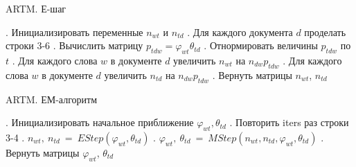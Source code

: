 \documentclass[12pt]{article}
\newenvironment{rusalgorithm}[1][htb]
  {\renewcommand{\algorithmcfname}{Алгоритм}
   \begin{algorithm}[#1]
  }{\end{algorithm}}
\renewcommand{\phi}{\varphi}
\begin{document}
\begin{rusalgorithm}[H]
\caption{ARTM. Е-шаг}\label{malgo4}
\begin{algorithmic}[]
\Procedure{EStep}{$\phi_{wt}, \theta_{td}$}
. Инициализировать переменные $n_{wt}$ и $n_{td}$
. Для каждого документа $d$ проделать строки 3-6
. Вычислить матрицу $p_{tdw} = \phi_{wt} \theta_{td}$
. Отнормировать величины $p_{tdw}$ по $t$
. Для каждого слова $w$ в документе $d$ увеличить $n_{wt}$ на $n_{dw}p_{tdw}$
. Для каждого слова $w$ в документе $d$ увеличить $n_{td}$ на $n_{dw}p_{tdw}$
. Вернуть матрицы $n_{wt}$, $n_{td}$
\EndProcedure
\end{algorithmic}
\end{rusalgorithm}
\newpage

\begin{rusalgorithm}[H]
\caption{ARTM. ЕМ-алгоритм}\label{malgo5}
\begin{algorithmic}[]
. Инициализировать начальное приближение $\phi_{wt}, \theta_{td}$
. Повторить iters раз строки 3-4
. $n_{wt},~n_{td}~=~EStep(\phi_{wt}, \theta_{td})$
. $\phi_{wt},~\theta_{td}~=~MStep(n_{wt},n_{td},\phi_{wt}, \theta_{td})$
. Вернуть матрицы $\phi_{wt}$, $\theta_{td}$
\EndProcedure
\end{algorithmic}
\end{rusalgorithm}
\end{document}
